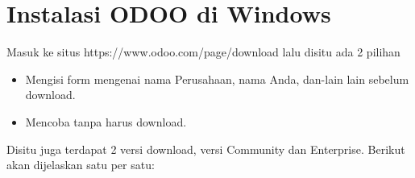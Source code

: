 \section{Instalasi ODOO di Windows}
Masuk ke situs https://www.odoo.com/page/download lalu disitu ada 2 pilihan
\begin{itemize}
  \item Mengisi form mengenai nama Perusahaan, nama Anda, dan-lain lain sebelum download.
  \item Mencoba tanpa harus download.
\end{itemize}
Disitu juga terdapat 2 versi download, versi Community dan Enterprise. Berikut akan dijelaskan satu per satu: